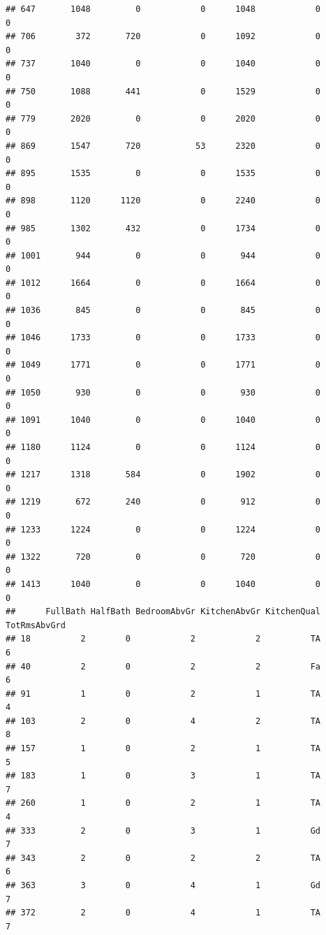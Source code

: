 \documentclass[]{article}
\begin{document}
\begin{verbatim}
## 647       1048         0            0      1048            0            0
## 706        372       720            0      1092            0            0
## 737       1040         0            0      1040            0            0
## 750       1088       441            0      1529            0            0
## 779       2020         0            0      2020            0            0
## 869       1547       720           53      2320            0            0
## 895       1535         0            0      1535            0            0
## 898       1120      1120            0      2240            0            0
## 985       1302       432            0      1734            0            0
## 1001       944         0            0       944            0            0
## 1012      1664         0            0      1664            0            0
## 1036       845         0            0       845            0            0
## 1046      1733         0            0      1733            0            0
## 1049      1771         0            0      1771            0            0
## 1050       930         0            0       930            0            0
## 1091      1040         0            0      1040            0            0
## 1180      1124         0            0      1124            0            0
## 1217      1318       584            0      1902            0            0
## 1219       672       240            0       912            0            0
## 1233      1224         0            0      1224            0            0
## 1322       720         0            0       720            0            0
## 1413      1040         0            0      1040            0            0
##      FullBath HalfBath BedroomAbvGr KitchenAbvGr KitchenQual TotRmsAbvGrd
## 18          2        0            2            2          TA            6
## 40          2        0            2            2          Fa            6
## 91          1        0            2            1          TA            4
## 103         2        0            4            2          TA            8
## 157         1        0            2            1          TA            5
## 183         1        0            3            1          TA            7
## 260         1        0            2            1          TA            4
## 333         2        0            3            1          Gd            7
## 343         2        0            2            2          TA            6
## 363         3        0            4            1          Gd            7
## 372         2        0            4            1          TA            7

\end{verbatim}
\end{document}
